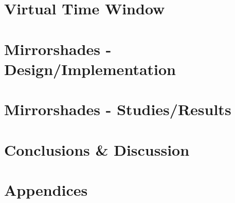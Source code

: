 \documentclass{report}
\begin{document}

\chapter{Virtual Time Window}



\chapter{Mirrorshades - Design/Implementation}
\graphicspath{ {05/} }



\chapter{Mirrorshades - Studies/Results}
\graphicspath{ {06/} }



\chapter{Conclusions \& Discussion}



\chapter*{Appendices}





\end{document}
